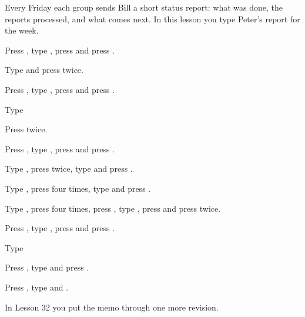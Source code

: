 Every Friday each group sends Bill a short status report: what was done,
the reports processed, and what comes next.  In this lesson you type
Peter's report for the week.

\begin{WPSteps}
\item Press , type , press
 and press .
\item Type  and press 
twice.
\end{WPSteps}

\begin{WPSteps}
\item Press , type , press
 and press .
\item Type
\item Press  twice.
\end{WPSteps}

\begin{WPSteps}
\item Press , type , press
 and press .
\item Type , press  twice,
type  and press .
\item Type , press  four times,
type  and press .
\item Type , press  four times,
press , type , press 
and press  twice.
\end{WPSteps}

\begin{WPSteps}
\item Press , type , press
 and press .
\item Type 
\end{WPSteps}

\begin{WPSteps}
\item Press , type  and press
.
\item Press , type  and .
\end{WPSteps}
\EndReplay
In Lesson 32 you put the memo through one more revision.
